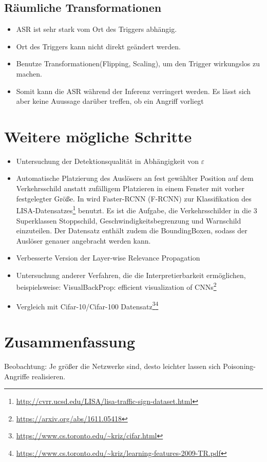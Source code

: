 \documentclass[twoside, 11pt,a4paper]{article}
\numberwithin{equation}{section}
\begin{document}
	\subsection{Räumliche Transformationen}
	\begin{itemize}
		\item ASR ist sehr stark vom Ort des Triggers abhängig.
		\item Ort des Triggers kann nicht direkt geändert werden.
		\item Benutze Transformationen(Flipping, Scaling), um den Trigger wirkungslos zu machen.
		\item Somit kann die ASR während der Inferenz verringert werden. Es lässt sich aber keine Auussage darüber treffen, ob ein Angriff vorliegt
	\end{itemize}
	\newpage
	\section{Weitere mögliche Schritte} \label{chapter_weitereSchritte}
	\begin{itemize}
		\item Untersuchung der Detektionsqualität in Abhängigkeit von $\varepsilon$
		\item Automatische Platzierung des Auslösers an fest gewählter Position auf dem Verkehrsschild anstatt zufälligem Platzieren in einem Fenster mit vorher festgelegter Größe. In \cite{badnets} wird  Faster-RCNN (F-RCNN) zur Klassifikation des LISA-Datensatzes\footnote{\url{http://cvrr.ucsd.edu/LISA/lisa-traffic-sign-dataset.html}} benutzt. Es ist die Aufgabe, die Verkehrsschilder in die 3 Superklassen Stoppschild, Geschwindigkeitsbegrenzung und Warnschild einzuteilen. Der Datensatz enthält zudem die BoundingBoxen, sodass der Auslöser genauer angebracht werden kann.
		\item Verbesserte Version der Layer-wise Relevance Propagation
		\item Untersuchung anderer Verfahren, die die Interpretierbarkeit ermöglichen, beispielsweise: VisualBackProp: efficient visualization of CNNs\footnote{\url{https://arxiv.org/abs/1611.05418}}
		\item Vergleich mit Cifar-10/Cifar-100 Datensatz\footnote{\url{https://www.cs.toronto.edu/~kriz/cifar.html}}\footnote{\url{https://www.cs.toronto.edu/~kriz/learning-features-2009-TR.pdf}}
	\end{itemize}
	
	
	\section{Zusammenfassung} \label{chapter_conclusion}
	Beobachtung: Je größer die Netzwerke sind, desto leichter lassen sich Poisoning-Angriffe realisieren.
	
\end{document}
